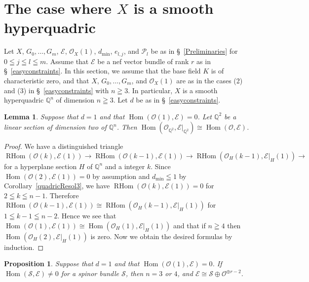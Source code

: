 \documentclass[a4paper,12pt]{amsart}
\newtheorem{prop}[thm]{Proposition}%
\newtheorem{lemma}[thm]{Lemma}%
\DeclareMathOperator{\Hom}{Hom}
\DeclareMathOperator{\RHom}{RHom}
\begin{document}
\section{The case where $X$ is a smooth hyperquadric}
Let $X$, $G_0,\dots,G_m$, 
$\mathcal{E}$, $\mathcal{O}_X(1)$,
$d_{\min}$, $e_{l,j}$, 
and 
$\mathcal{P}_l
$
be as in \S~\ref{Preliminaries}
for $0\leqq j\leqq l\leqq m$.
Assume that $\mathcal{E}$ be a nef vector bundle of rank $r$ as in \S~\ref{easyconstraints}.
In this section, we assume 
that the base field $K$ is of characteristic zero,
and that $X$, $G_0,\dots,G_m$, and $\mathcal{O}_X(1)$ are as in the cases (2) and (3) in \S~\ref{easyconstraints}
with $n\geqq 3$.
In particular, $X$ is a smooth hyperquadric $\mathbb{Q}^n$ of dimension $n\geqq 3$.
Let $d$ be as in \S~\ref{easyconstraints}. 


\begin{lemma}\label{withoutO(1)}
Suppose 
that $d=1$ and that $\Hom (\mathcal{O}(1),\mathcal{E})=0$.
Let $\mathbb{Q}^2$ be a 
linear section 
of dimension two
of $\mathbb{Q}^n$.
Then 
$\Hom (\mathcal{O}_{\mathbb{Q}^2},\mathcal{E}|_{\mathbb{Q}^2})\cong \Hom (\mathcal{O},\mathcal{E})$.
\end{lemma}
\begin{proof}
We have a distinguished triangle
\[
\RHom(\mathcal{O}(k),\mathcal{E}(1))
\to
\RHom(\mathcal{O}(k-1),\mathcal{E}(1))
\to
\RHom(\mathcal{O}_H(k-1),\mathcal{E}|_H(1))
\to
\]
for a hyperplane section $H$ of $\mathbb{Q}^n$ and a integer $k$.
Since $\Hom (\mathcal{O}(2),\mathcal{E}(1))=0$ by assumption
and $d_{\min}\leqq 1$ by Corollary~\ref{quadricResol3}, 
we have $\RHom(\mathcal{O}(k),\mathcal{E}(1))=0$
for $2\leqq k\leqq n-1$.
Therefore $\RHom(\mathcal{O}(k-1),\mathcal{E}(1))
\cong
\RHom(\mathcal{O}_H(k-1),\mathcal{E}|_H(1))$ for $1\leqq k-1\leqq n-2$.
Hence we see that 
$\Hom(\mathcal{O}(1),\mathcal{E}(1))
\cong
\Hom(\mathcal{O}_H(1),\mathcal{E}|_H(1))$
and that if $n\geqq 4$
then $\Hom(\mathcal{O}_H(2),\mathcal{E}|_H(1))$ is zero.
Now we obtain the desired formulas by induction.
\end{proof}
\begin{prop}\label{dmin0spinor}
Suppose that $d=1$ and 
that $\Hom (\mathcal{O}(1),\mathcal{E})=0$.
If $\Hom (\mathcal{S},\mathcal{E})\neq 0$
for a spinor bundle $\mathcal{S}$,
then $n=3$ or $4$, and $\mathcal{E}\cong \mathcal{S}\oplus \mathcal{O}^{\oplus r-2}$.
\end{prop}
\end{document}
